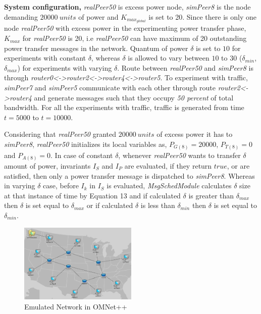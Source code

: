 {\bf System configuration, }\textit{realPeer50} is excess power node, \textit{simPeer8} is the node demanding $20000~units$ of power and $K_{max_{global}}$ is set to 20. Since there is only one node \textit{realPeer50} with excess power in the experimenting power transfer phase, $K_{max}$ for \textit{realPeer50} is 20, i.e \textit{realPeer50} can have maximum of 20 outstanding power transfer messages in the network. Quantum of power $\delta$ is set to $10$ for experiments with constant $\delta$, whereas $\delta$ is allowed to vary between $10$ to $30$ ($\delta_{min}$, $\delta_{max}$) for experiments with varying $\delta$. Route between \textit{realPeer50} and \textit{simPeer8} is through \textit{router0<->router2<->router4<->router5}. To experiment with traffic, \textit{simPeer7} and \textit{simPeer5} communicate with each other through route \textit{router2<->router4} and generate messages such that
they occupy \textit{50 percent} of total bandwidth. For all the experiments with traffic, traffic is generated from time $t=5000$ to $t=10000$. 

Considering that \textit{realPeer50} granted $20000~units$ of excess power it has to \textit{simPeer8}, \textit{realPeer50} initializes its local variables as, $P_{G(8)}=20000$, $P_{T(8)}=0$ and $P_{A(8)}=0$. In case of constant $\delta$, whenever \textit{realPeer50} wants to transfer $\delta$ amount of power, invariants $I_S$ and $I_P$ are evaluated, if they return $true$, or are satisfied, then only a power transfer message is dispatched to \textit{simPeer8}. Whereas in varying $\delta$ case, before $I_k$ in $I_S$ is evaluated, \textit{MsgSchedModule} calculates $\delta$ size at that instance of time by Equation 13 and if calculated $\delta$ is greater than $\delta_{max}$ then $\delta$ is set equal to $\delta_{max}$ or if calculated $\delta$ is less than $\delta_{min}$ then $\delta$ is set equal to $\delta_{min}$.

\begin{figure}[htb]
  \begin{center}
    \includegraphics[width=0.50\textwidth]{Figures/iccps2014/dgi_net.png}
  \caption{Emulated Network in OMNet++}
  \label{fig:dgi_net}
  \end{center}
\end{figure}

